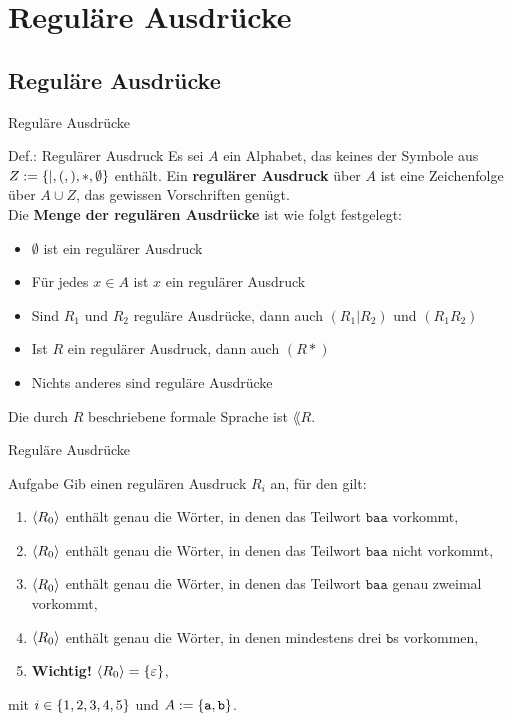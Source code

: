 \section{Reguläre Ausdrücke}
\subsection{Reguläre Ausdrücke}

\begin{frame}{Reguläre Ausdrücke}
\begin{block}{Def.: Regulärer Ausdruck}
	Es sei $A$ ein Alphabet, das keines der Symbole aus $Z := \left\{ \mid, (, ), *, \emptyset \right\}$ enthält.
	Ein \textbf{regulärer Ausdruck} über $A$ ist eine Zeichenfolge über $A \cup Z$, das gewissen Vorschriften genügt.\\
	Die \textbf{Menge der regulären Ausdrücke} ist wie folgt festgelegt:
	\begin{itemize}
		\item $\emptyset$ ist ein regulärer Ausdruck
		\item Für jedes $x \in A$ ist $x$ ein regulärer Ausdruck
		\item Sind $R_1$ und $R_2$ reguläre Ausdrücke, dann auch $(R_1 | R_2 )$ und $(R_1R_2)$
		\item Ist $R$ ein regulärer Ausdruck, dann auch $(R*)$
		\item Nichts anderes sind reguläre Ausdrücke
	\end{itemize}
	Die durch $R$ beschriebene formale Sprache ist $\lang{R}$.
\end{block}
\end{frame}

\begin{frame}{Reguläre Ausdrücke}
\begin{exampleblock}{Aufgabe}
	Gib einen regulären Ausdruck $R_i$ an, für den gilt:
	\begin{enumerate}
		\item $\lang{R_\theenumi}$ enthält genau die Wörter, in denen das Teilwort $\texttt{baa}$ vorkommt,
		\item $\lang{R_\theenumi}$ enthält genau die Wörter, in denen das Teilwort $\texttt{baa}$ nicht vorkommt,
		\item $\lang{R_\theenumi}$ enthält genau die Wörter, in denen das Teilwort $\texttt{baa}$ genau zweimal vorkommt,
		\item $\lang{R_\theenumi}$ enthält genau die Wörter, in denen mindestens drei $\texttt{b}$s vorkommen,
		\item \textbf{Wichtig!} $\lang{R_\theenumi} = \set{\varepsilon}$,
	\end{enumerate}
	mit $i \in \left\{ 1,2,3,4,5 \right\}$ und $A := \left\{ \texttt{a}, \texttt{b} \right\}$.
\end{exampleblock}
\end{frame}

